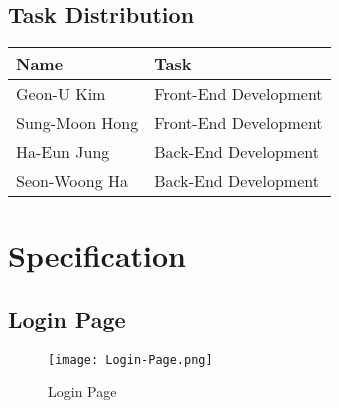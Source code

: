 \documentclass[conference]{IEEEtran}
\begin{document}
\subsection{Task Distribution}

\begin{table}[H] 
\renewcommand\arraystretch{1.25}
\centering 
\begin{threeparttable}
    \scriptsize
    \begin{tabular}{@{}p{3cm} p{5.3cm}@{}}
    \toprule
    \bfseries Name & \bfseries Task \\ 
    \midrule
    Geon-U Kim & Front-End Development \\ 
    Sung-Moon Hong & Front-End Development\\ 
    Ha-Eun Jung & Back-End Development\\ 
    Seon-Woong Ha & Back-End Development\\ 
    \bottomrule
    \end{tabular}
\end{threeparttable}
\end{table}

\section{Specification}
\subsection{Login Page}
\begin{figure}[H]
    \centering    
    \texttt{[image: Login-Page.png]}
    \caption{Login Page}
    \label{fig:Login Page}
\end{figure}
\end{document}
